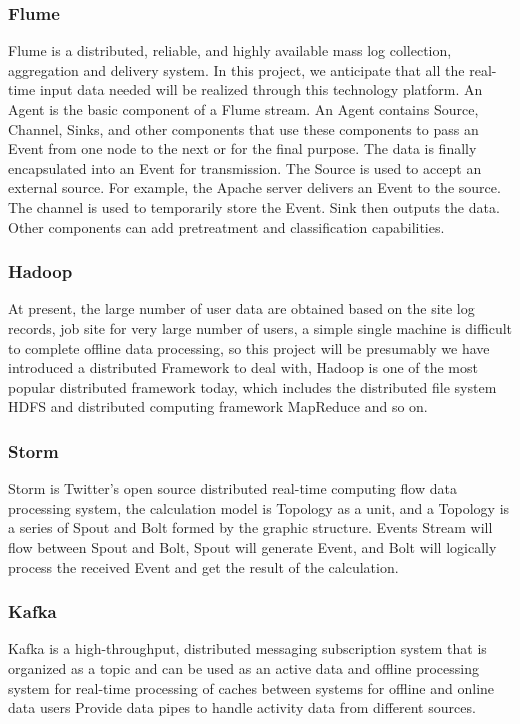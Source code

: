 \documentclass[sigconf]{acmart}
\begin{document}
\subsubsection{Flume}
Flume is a distributed, reliable, and highly available mass log collection, aggregation and delivery system. In this project, we anticipate that all the real-time input data needed will be realized through this technology platform. An Agent is the basic component of a Flume stream. An Agent contains Source, Channel, Sinks, and other components that use these components to pass an Event from one node to the next or for the final purpose. The data is finally encapsulated into an Event for transmission. The Source is used to accept an external source. For example, the Apache server delivers an Event to the source. The channel is used to temporarily store the Event. Sink then outputs the data. Other components can add pretreatment and classification capabilities.

\subsubsection{Hadoop}
At present, the large number of user data are obtained based on the site log records, job site for very large number of users, a simple single machine is difficult to complete offline data processing, so this project will be presumably we have introduced a distributed Framework to deal with, Hadoop is one of the most popular distributed framework today, which includes the distributed file system HDFS and distributed computing framework MapReduce and so on.


\subsubsection{Storm}
Storm is Twitter's open source distributed real-time computing flow data processing system, the calculation model is Topology as a unit, and a Topology is a series of Spout and Bolt formed by the graphic structure. Events Stream will flow between Spout and Bolt, Spout will generate Event, and Bolt will logically process the received Event and get the result of the calculation.


\subsubsection{Kafka}
Kafka is a high-throughput, distributed messaging subscription system that is organized as a topic and can be used as an active data and offline processing system for real-time processing of caches between systems for offline and online data users Provide data pipes to handle activity data from different sources.
\end{document}

